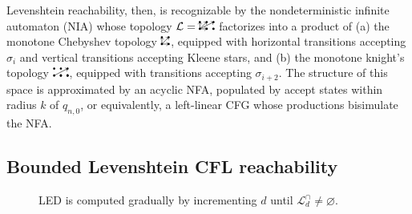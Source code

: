 \documentclass[sigplan,review,anonymous,acmsmall]{acmart}\settopmatter{printfolios=false,printccs=false,printacmref=false}
\begin{document}
Levenshtein reachability, then, is recognizable by the nondeterministic infinite automaton (NIA) whose topology $\mathcal{L} = \knightkingarrow$ factorizes into a product of (a) the monotone Chebyshev topology $\kingarrow$, equipped with horizontal transitions accepting $\sigma_{i}$ and vertical transitions accepting Kleene stars, and (b) the monotone knight's topology $\knightarrow$, equipped with transitions accepting $\sigma_{i+2}$. The structure of this space is approximated by an acyclic NFA, populated by accept states within radius $k$ of $q_{n,0}$, or equivalently, a left-linear CFG whose productions bisimulate the NFA.

\subsection{Bounded Levenshtein CFL reachability}\label{sec:editreach}


\begin{figure}
  \vspace{-10pt}
  \resizebox{0.33\textwidth}{!}{}
  \caption{LED is computed gradually by incrementing $d$ until $\mathcal{L}^\cap_{d}\neq \varnothing$.}
\end{figure}
\end{document}
